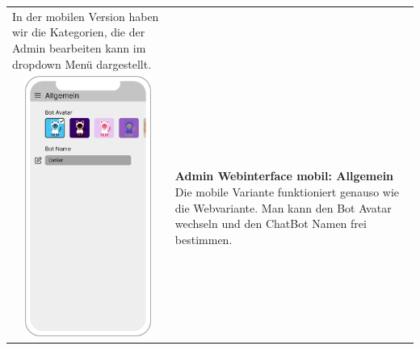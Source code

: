 \begin{tabular}{C{6cm}  L{7cm}}
    In der mobilen Version haben wir die Kategorien, die der Admin bearbeiten kann im dropdown Menü dargestellt.                                                                         \\
    \includegraphics[width=5cm,height=8.5cm]{bilder/new vers. UI Design/Allgemein/iPhone X Allgemein III.png}      & \textbf{Admin Webinterface mobil: Allgemein} \newline
    Die mobile Variante funktioniert genauso wie die Webvariante. Man kann den Bot Avatar wechseln und den
    ChatBot Namen frei bestimmen.
\end{tabular}

